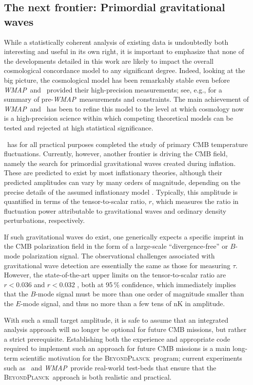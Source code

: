 \documentclass[twocolumn]{aa}
\def\WMAP{\emph{WMAP}}
\newcommand{\BP}{\textsc{BeyondPlanck}}
\begin{document}
\subsection{The next frontier: Primordial gravitational waves}
\label{sec:frontier}

While a statistically coherent analysis of existing data is
undoubtedly both interesting and useful in its own right, it is
important to emphasize that none of the developments detailed in this
work are likely to impact the overall cosmological concordance model
to any significant degree. Indeed, looking at the big picture, the
cosmological model has been remarkably stable even before \WMAP\ and
\Planck\ provided their high-precision measurements; see, e.g.,
\citet{wang:2003} for a summary of pre-\WMAP\ measurements and
constraints. The main achievement of \WMAP\ and \Planck\ has been to
refine this model to the level at which cosmology now is a
high-precision science within which competing theoretical models can
be tested and rejected at high statistical significance.

\Planck\ has for all practical purposes completed the study of primary
CMB temperature fluctuations.  Currently, however, another frontier is
driving the CMB field, namely the search for primordial gravitational
waves created during inflation. These are predicted to exist by
most inflationary theories, although their predicted amplitudes can vary
by many orders of magnitude, depending on the precise details of the
assumed inflationary model \citep[e.g.,][]{kamionkowski:2016}. Typically, this amplitude is quantified in
terms of the tensor-to-scalar ratio, $r$, which measures the ratio in
fluctuation power attributable to gravitational waves and ordinary
density perturbations, respectively.

If such gravitational waves do exist, one generically expects a
specific imprint in the CMB polarization field in the form of a
large-scale ``divergence-free'' or $B$-mode polarization signal. The
observational challenges associated with gravitational wave detection
are essentially the same as those for measuring $\tau$.  However, the
state-of-the-art upper limits on the tensor-to-scalar ratio are
$r<0.036$ \citep{bicep2021} and $r<0.032$ \citep{tristram:2021}, both
at 95\,\% confidence, which immediately implies that the $B$-mode
signal must be more than one order of magnitude smaller than the
$E$-mode signal, and thus no more than a few tens of nK in amplitude.

With such a small target amplitude, it is safe to assume that an
integrated analysis approach will no longer be optional for future CMB
missions, but rather a strict prerequisite. Establishing both the
experience and appropriate code required to implement such an approach
for future CMB missions is a main long-term scientific motivation
for the \BP\ program; current experiments such as \Planck\ and
\WMAP\ provide real-world test-beds that ensure that the \BP\ approach
is both realistic and practical.
\end{document}
